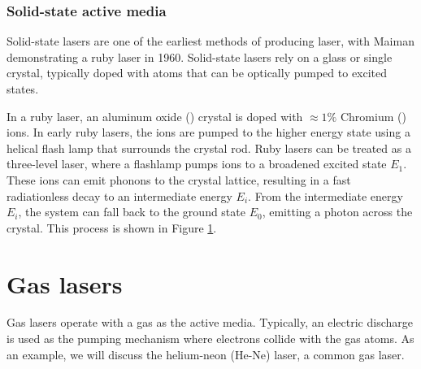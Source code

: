 \documentclass{homework}
\begin{document}
	
	\subsubsection*{Solid-state active media}
	Solid-state lasers are one of the earliest methods of producing laser, with Maiman demonstrating a ruby laser in 1960.  Solid-state lasers rely on a glass or single crystal, typically doped with atoms that can be optically pumped to excited states. 
	
	In a ruby laser, an aluminum oxide () crystal is doped with $\approx 1\%$ Chromium () ions. In early ruby lasers, the ions are pumped to the higher energy state using a helical flash lamp that surrounds the crystal rod. Ruby lasers can be treated as a three-level laser, where a flashlamp pumps ions to a broadened excited state $E_1$. These ions can emit phonons to the crystal lattice, resulting in a fast radiationless decay to an intermediate energy $E_i$. From the intermediate energy $E_i$, the system can fall back to the ground state $E_0$, emitting a photon across the crystal. This process is shown in Figure \ref{}.
	
	\section{Gas lasers}
	Gas lasers operate with a gas as the active media. Typically, an electric discharge is used as the pumping mechanism where electrons collide with the gas atoms. As an example, we will discuss the helium-neon (He-Ne) laser, a common gas laser. 
	
\end{document}
